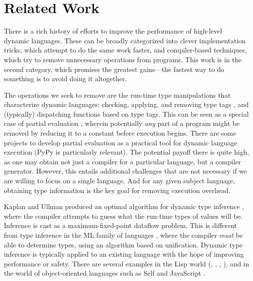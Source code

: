 \chapter{Related Work}

There is a rich history of efforts to improve the performance of high-level
dynamic languages. These can be broadly categorized into clever
implementation tricks, which attempt to do the same work faster, and
compiler-based techniques, which try to remove unnecessary
operations from programs. This work is in the second
category, which promises the greatest gains---the fastest way to do
something is to avoid doing it altogether.

The operations we seek to remove are the run-time type manipulations
that characterize dynamic languages: checking, applying, and removing
type tags \cite{taggingopt}, and (typically) dispatching functions based on
type tags.
This can be seen as a special case of partial evaluation \cite{futamura},
wherein potentially \emph{any} part of a program might be removed by
reducing it to a constant before execution begins. There are some projects
to develop partial evaluation as a practical tool for dynamic language execution
(PyPy \cite{pypyjit} is particularly relevant). The potential payoff there
is quite high, as one may obtain not just a compiler for a particular
language, but a compiler generator. However, this entails additional
challenges that are not necessary if we are willing to focus on a single
language. And for any given subject language, obtaining type information
is the key goal for removing execution overhead.

Kaplan and Ullman produced an optimal algorithm
for dynamic type inference \cite{kaplanullman}, where the compiler
attempts to guess what the run-time types of values will be.
Inference is cast as a maximum-fixed-point dataflow problem.
This is different from type inference in the ML family of languages
\cite{MLtypeinf}, where the compiler \emph{must} be able to determine
types, using an algorithm based on unification.
Dynamic type inference is typically applied to an existing language
with the hope of improving performance or safety. There are several
examples in the
Lisp world (\cite{TICL}, \cite{pticl}, \cite{nimble}, \cite{taggingopt}),
and in the world of object-oriented languages such as Self \cite{selflang}
and JavaScript \cite{typeinfjavascript}.

